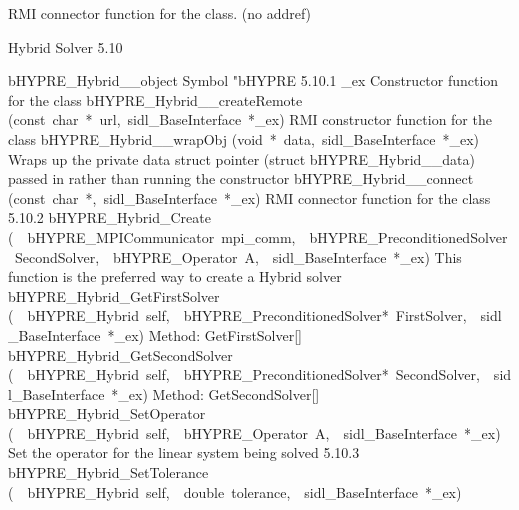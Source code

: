 \documentclass{article}
\begin{document}
\begin{cxxentry}
\begin{cxxentry}
\begin{cxxvariable}
\begin{cxxdoc}
RMI connector function for the class. (no addref)
\end{cxxdoc}
\end{cxxvariable}
\end{cxxentry}
\begin{cxxentry}
{}
        {Hybrid Solver}
        {}
        {
}
        {5.10}
\begin{cxxnames}
        {bHYPRE\_Hybrid\_\_object}
        {}
        {
Symbol "bHYPRE}
        {5.10.1}
        {\_ex}
        {}
        {
Constructor function for the class}
        {}
\label{cxx.5.10.11}
        {bHYPRE\_Hybrid\_\_createRemote}
        {(const\ char\ *\ url,\ sidl\_BaseInterface\ *\_ex)}
        {
RMI constructor function for the class}
        {}
\label{cxx.5.10.12}
        {bHYPRE\_Hybrid\_\_wrapObj}
        {(void\ *\ data,\ sidl\_BaseInterface\ *\_ex)}
        {
Wraps up the private data struct pointer (struct bHYPRE\_Hybrid\_\_data) passed in rather than running the constructor}
        {}
\label{cxx.5.10.13}
        {bHYPRE\_Hybrid\_\_connect}
        {(const\ char\ *,\ sidl\_BaseInterface\ *\_ex)}
        {
RMI connector function for the class}
        {5.10.2}
        {bHYPRE\_Hybrid\_Create}
        {(\ \ bHYPRE\_MPICommunicator\ mpi\_comm,\ \ bHYPRE\_PreconditionedSolver\ SecondSolver,\ \ bHYPRE\_Operator\ A,\ \ sidl\_BaseInterface\ *\_ex)}
        {
This function is the preferred way to create a Hybrid solver}
        {}
\label{cxx.5.10.14}
        {bHYPRE\_Hybrid\_GetFirstSolver}
        {(\ \ bHYPRE\_Hybrid\ self,\ \ bHYPRE\_PreconditionedSolver*\ FirstSolver,\ \ sidl\_BaseInterface\ *\_ex)}
        {
Method:  GetFirstSolver[]}
        {}
\label{cxx.5.10.15}
        {bHYPRE\_Hybrid\_GetSecondSolver}
        {(\ \ bHYPRE\_Hybrid\ self,\ \ bHYPRE\_PreconditionedSolver*\ SecondSolver,\ \ sidl\_BaseInterface\ *\_ex)}
        {
Method:  GetSecondSolver[]}
        {}
\label{cxx.5.10.16}
        {bHYPRE\_Hybrid\_SetOperator}
        {(\ \ bHYPRE\_Hybrid\ self,\ \ bHYPRE\_Operator\ A,\ \ sidl\_BaseInterface\ *\_ex)}
        {
Set the operator for the linear system being solved}
        {5.10.3}
        {bHYPRE\_Hybrid\_SetTolerance}
        {(\ \ bHYPRE\_Hybrid\ self,\ \ double\ tolerance,\ \ sidl\_BaseInterface\ *\_ex)}

\end{cxxnames}
\end{cxxentry}
\end{cxxentry}
\end{document}
